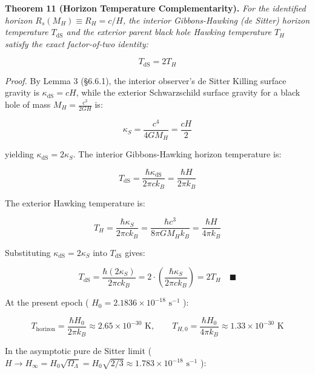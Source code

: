 \documentclass[11pt,a4paper]{article}
\theoremstyle{definition}
\theoremstyle{remark}
\begin{document}
\textbf{Theorem 11 (Horizon Temperature Complementarity).} \textit{For the identified horizon $R_s(M_H) \equiv R_H = c/H$, the interior Gibbons-Hawking (de Sitter) horizon temperature $T_{\text{dS}}$ and the exterior parent black hole Hawking temperature $T_H$ satisfy the exact factor-of-two identity:}


\begin{equation}
T_{\text{dS}} = 2 T_H
\end{equation}


\textit{Proof.} By Lemma 3 (\S 6.6.1), the interior observer's de Sitter Killing surface gravity is $\kappa_{\text{dS}} = c H$, while the exterior Schwarzschild surface gravity for a black hole of mass $M_H = \frac{c^3}{2GH}$ is:


\begin{equation}
\kappa_S = \frac{c^4}{4 G M_H} = \frac{c H}{2}
\end{equation}


yielding $\kappa_{\text{dS}} = 2\kappa_S$. The interior Gibbons-Hawking horizon temperature is:


\begin{equation}
T_{\text{dS}} = \frac{\hbar \kappa_{\text{dS}}}{2\pi c k_B} = \frac{\hbar H}{2\pi k_B}
\end{equation}


The exterior Hawking temperature is:


\begin{equation}
T_H = \frac{\hbar \kappa_S}{2\pi c k_B} = \frac{\hbar c^3}{8\pi G M_H k_B} = \frac{\hbar H}{4\pi k_B}
\end{equation}


Substituting $\kappa_{\text{dS}} = 2\kappa_S$ into $T_{\text{dS}}$ gives:


\begin{equation}
T_{\text{dS}} = \frac{\hbar (2\kappa_S)}{2\pi c k_B} = 2 \cdot \left(\frac{\hbar \kappa_S}{2\pi c k_B}\right) = 2 T_H \quad \blacksquare
\end{equation}


At the present epoch ( $H_0 = 2.1836 \times 10^{-18} \text{ s}^{-1}$ ):


\begin{equation}
T_{\text{horizon}} = \frac{\hbar H_0}{2\pi k_B} \approx 2.65 \times 10^{-30} \text{ K}, \qquad T_{H,0} = \frac{\hbar H_0}{4\pi k_B} \approx 1.33 \times 10^{-30} \text{ K}
\end{equation}


In the asymptotic pure de Sitter limit ( $H \to H_\infty = H_0 \sqrt{\Omega_\Lambda} = H_0 \sqrt{2/3} \approx 1.783 \times 10^{-18} \text{ s}^{-1}$ ):
\end{document}
